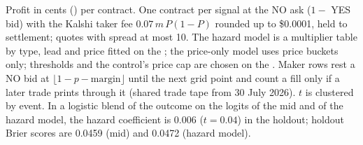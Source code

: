 \begin{table}[ht]
\begin{threeparttable}
\begin{tablenotes}
\item Profit in cents (\textcent) per contract. One contract per signal at the NO ask ($1-$ YES bid) with the Kalshi taker fee
$0.07\,m\,P(1-P)$ rounded up to \$0.0001, held to settlement; quotes with spread at most
10\textcent. The hazard model is a multiplier table by type, lead and price fitted on the \estim; the
price-only model uses price buckets only; thresholds and the control's price cap are chosen on the
\estim. Maker rows rest a NO bid at $\lfloor 1-p-\text{margin}\rfloor$ until the next grid point and
count a fill only if a later trade prints through it (shared trade tape from 30 July 2026). $t$ is
clustered by event. In a logistic blend of the outcome on the logits of the mid and of the hazard
model, the hazard coefficient is 0.006 ($t=0.04$) in the holdout; holdout Brier scores are 0.0459
(mid) and 0.0472 (hazard model).
\end{tablenotes}
\end{threeparttable}
\end{table}
